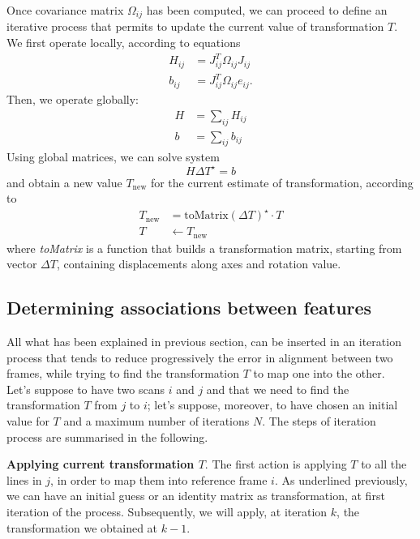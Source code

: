 \documentclass[a4paper, onecolumn]{report}
\begin{document}
Once covariance matrix $\Omega_{ij}$ has been computed, we can proceed to define an iterative process that permits to update the current value of transformation $T$. We first operate locally, according to equations
\begin{equation}
	\begin{aligned}
		H_{ij} &= J_{ij}^T\Omega_{ij}J_{ij} \\
		b_{ij} &= J_{ij}^T\Omega_{ij}e_{ij}.
	\end{aligned}
\end{equation}
Then, we operate globally:
\begin{equation}
	\begin{aligned}
		H &= \sum_{ij} H_{ij} \\
		b &= \sum_{ij} b_{ij}
	\end{aligned}
\end{equation}
Using global matrices, we can solve system 
\begin{equation}
	H\Delta T^\star = b
\end{equation}
and obtain a new value $T_{\mbox{new}}$ for the current estimate of transformation, according to
\begin{equation}
	\begin{aligned}
		T_{\mbox{new}} &= \mbox{toMatrix}(\Delta T)^\star \cdot T \\
		T  &\leftarrow  T_{\mbox{new}} 
	\end{aligned}
\end{equation}
where \emph{toMatrix} is a function that builds a transformation matrix, starting from vector $\Delta T$, containing displacements along axes and rotation value.

\subsection{Determining associations between features}
All what has been explained in previous section, can be inserted in an iteration process that tends to reduce progressively the error in alignment between two frames, while trying to find the transformation $T$ to map one into the other. \\
Let's suppose to have two scans $i$ and $j$ and that we need to find the transformation $T$ from $j$ to $i$; let's suppose, moreover, to have chosen an initial value for $T$ and a maximum number of iterations $N$. The steps of iteration process are summarised in the following.

\textbf{Applying current transformation $T$}. The first action is applying $T$ to all the lines in $j$, in order to map them into reference frame $i$. As underlined previously, we can have an initial guess or an identity matrix as transformation, at first iteration of the process. Subsequently, we will apply, at iteration $k$, the transformation we obtained at $k-1$.
\end{document}
